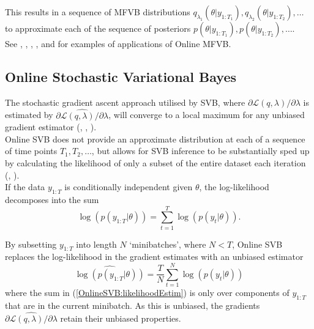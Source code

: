 \documentclass[
12pt, %
onehalfspacing, %
nohyperref, %
headsepline, %
chapterinoneline, %
]{MastersDoctoralThesis} %
\begin{document}
This results in a sequence of MFVB distributions $q_{\lambda_1}(\theta | y_{1:T_1}), q_{\lambda_2}(\theta | y_{1:T_2}), \ldots$ to approximate each of the sequence of posteriors $p(\theta | y_{1:T_1}), p(\theta | y_{1:T_2}), \ldots$.
\\ 

See \cite{Smidl2004}, \cite{Hoffman2010}, \cite{Wang2011}, \cite{Broderick2013}, and \cite{Kabisa2016} for examples of applications of Online MFVB.

\subsection{Online Stochastic Variational Bayes}
\label{subsec:OnlineSVB}

The stochastic gradient ascent approach utilised by SVB, where $\partial\mathcal{L}(q, \lambda) / \partial \lambda$ is estimated by $\widehat{\partial\mathcal{L}(q, \lambda) / \partial \lambda}$, will converge to a local maximum for any unbiased gradient estimator (\cite{Robbins1951}, \cite{Bottou1999}, \cite{Bottou2008}).
\\

Online SVB does not provide an approximate distribution at each of a sequence of time points $T_1, T_2, \ldots$, but allows for SVB inference to be substantially sped up by calculating the likelihood of only a subset of the entire dataset each iteration (\cite{Hoffman2013}, \cite{Titsias2014}).
\\

If the data $y_{1:T}$ is conditionally independent given $\theta$, the log-likelihood decomposes into the sum
\begin{equation}
\label{OnlineSVB:likelihood}
\log(p(y_{1:T} | \theta)) = \sum_{t=1}^T \log(p(y_t | \theta)).
\end{equation}

By subsetting $y_{1:T}$ into length $N$ `minibatches', where $N < T$, Online SVB replaces the log-likelihood in the gradient estimates with an unbiased estimator
\begin{equation}
\label{OnlineSVB:likelihoodEstim}
\widehat{\log(p(y_{1:T} | \theta))} = \frac{T}{N} \sum_{t=1}^N \log(p(y_t | \theta))
\end{equation}
where the sum in (\ref{OnlineSVB:likelihoodEstim}) is only over components of $y_{1:T}$ that are in the current minibatch. As this is unbiased, the gradients $\widehat{\partial\mathcal{L}(q, \lambda) / \partial \lambda}$ retain their unbiased properties.
\\
\end{document}
